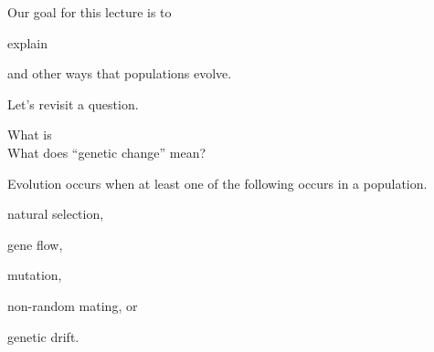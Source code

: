 \documentclass[t]{beamer}
\begin{document}
\begin{frame}{Our goal for this lecture is to }
	
	\hangpara explain  

	\hangpara and other ways that populations evolve.
	
\end{frame}
%
%
\begin{frame}[t,plain]{Let's revisit a question.}
	\vspace{2ex}
	
	\hangpara What is  \onslide<2->\\[2\baselineskip]
	

	\onslide<2->\hangpara What does ``genetic change'' mean?

\end{frame}


\begin{frame}{Evolution occurs when at least one of the following occurs in a population.}
	
	\hangpara natural selection,

	\hangpara gene flow,
	
	\hangpara mutation,
	
	\hangpara non-random mating, or

	\hangpara genetic drift.
	
\end{frame}
%
\end{document}
